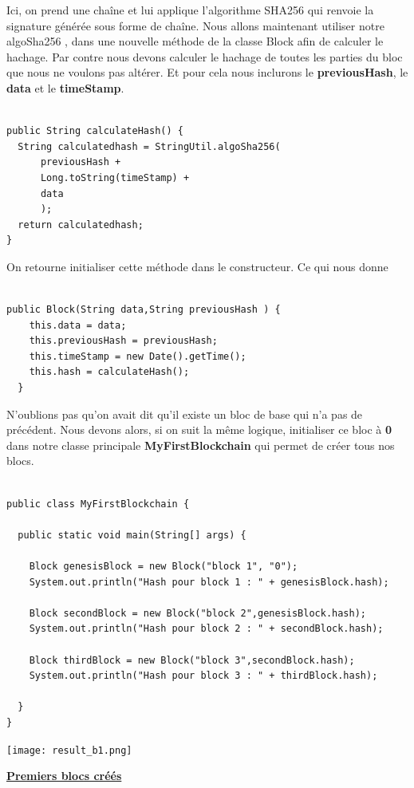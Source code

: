\documentclass[12pt]{report}
\begin{document}
Ici, on prend une chaîne et lui applique l'algorithme SHA256 qui renvoie la signature générée sous forme de chaîne. Nous allons maintenant utiliser notre algoSha256 , dans une nouvelle méthode de la classe Block afin de calculer le hachage. Par contre nous devons calculer le hachage de toutes les parties du bloc que nous ne voulons pas altérer. Et pour cela nous inclurons le \textbf{previousHash}, le \textbf{data} et le \textbf{timeStamp}.

\begin{lstlisting}

public String calculateHash() {
  String calculatedhash = StringUtil.algoSha256( 
      previousHash +
      Long.toString(timeStamp) +
      data 
      );
  return calculatedhash;
}
\end{lstlisting}

On retourne initialiser cette méthode dans le constructeur. Ce qui nous donne 

\begin{lstlisting}

public Block(String data,String previousHash ) {
    this.data = data;
    this.previousHash = previousHash;
    this.timeStamp = new Date().getTime();
    this.hash = calculateHash(); 
  }
\end{lstlisting}

N'oublions pas qu'on avait dit qu'il existe un bloc de base qui n'a pas de précédent. Nous devons alors, si on suit la même logique, initialiser ce bloc à \textbf{0} dans notre classe principale \textbf{MyFirstBlockchain} qui permet de créer tous nos blocs.

\begin{lstlisting}

public class MyFirstBlockchain {

  public static void main(String[] args) {

    Block genesisBlock = new Block("block 1", "0");
    System.out.println("Hash pour block 1 : " + genesisBlock.hash);
		
    Block secondBlock = new Block("block 2",genesisBlock.hash);
    System.out.println("Hash pour block 2 : " + secondBlock.hash);
		
    Block thirdBlock = new Block("block 3",secondBlock.hash);
    System.out.println("Hash pour block 3 : " + thirdBlock.hash);
		
  }
}

\end{lstlisting}


\texttt{[image: result\_b1.png]}
\begin{center}
   \textbf{\underline{Premiers blocs créés}} \\[1cm]
\end{center}
\end{document}
